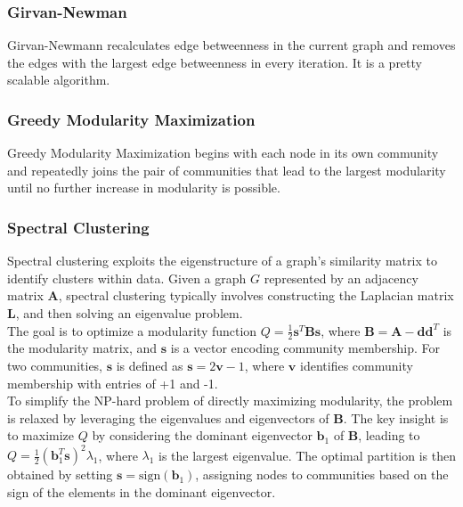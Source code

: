 \documentclass[10pt,twocolumn,letterpaper]{article}
\begin{document}
\subsubsection{Girvan-Newman}

Girvan-Newmann recalculates edge betweenness in the current graph and removes the edges with the largest edge betweenness in every iteration. It is a pretty scalable algorithm.


\subsubsection{Greedy Modularity Maximization}

Greedy Modularity Maximization begins with each node in its own community and repeatedly joins the pair of communities that lead to the largest modularity until no further increase in modularity is possible.

\subsubsection{Spectral Clustering}

Spectral clustering exploits the eigenstructure of a graph’s similarity matrix to identify clusters within data. Given a graph \( G \) represented by an adjacency matrix \( \mathbf{A} \), spectral clustering typically involves constructing the Laplacian matrix \( \mathbf{L} \), and then solving an eigenvalue problem. \\

The goal is to optimize a modularity function \( Q = \frac{1}{2} \mathbf{s}^T \mathbf{B} \mathbf{s} \), where \( \mathbf{B} = \mathbf{A} - \mathbf{d} \mathbf{d}^T \) is the modularity matrix, and \( \mathbf{s} \) is a vector encoding community membership. For two communities, \( \mathbf{s} \) is defined as \( \mathbf{s} = 2\mathbf{v} - 1 \), where \( \mathbf{v} \) identifies community membership with entries of +1 and -1. \\

To simplify the NP-hard problem of directly maximizing modularity, the problem is relaxed by leveraging the eigenvalues and eigenvectors of \( \mathbf{B} \). The key insight is to maximize \( Q \) by considering the dominant eigenvector \( \mathbf{b}_1 \) of \( \mathbf{B} \), leading to \( Q = \frac{1}{2} (\mathbf{b}_1^T \mathbf{s})^2 \lambda_1 \), where \( \lambda_1 \) is the largest eigenvalue. The optimal partition is then obtained by setting \( \mathbf{s} = \text{sign}(\mathbf{b}_1) \), assigning nodes to communities based on the sign of the elements in the dominant eigenvector. \\
\end{document}
